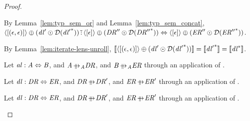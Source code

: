 \documentclass[numbers,10pt,preprint\ifanon ,nocopyrightspace\fi]{sigplanconf}
\begin{document}
\begin{proof}
\begin{case}[\AtomUnrollstarLeftRule{},\AtomUnrollstarRightRule{}]
\begin{subcase}[\ParallelAtomStructuralRewriteRule{}]
      By Lemma~\ref{lem:typ_sem_or} and Lemma~\ref{lem:typ_sem_concat},
      $\langle[(\epsilon,\epsilon)]\rangle \oplus
      (\mathit{dl}' \odot \mathcal{D}({\mathit{dl}'}^*))
      \,\tilde{:}\, \langle[\epsilon]\rangle \oplus (\mathit{DR}''
      \odot \mathcal{D}({\mathit{DR}''}^*)) \Leftrightarrow
      \langle[\epsilon]\rangle \oplus (\mathit{ER}'' \odot
      \mathcal{D}({\mathit{ER}''}^*))$.

      By Lemma~\ref{lem:iterate-lens-unroll},
      $[ \! [\langle[(\epsilon,\epsilon)]\rangle
        \oplus
        (\mathit{dl}' \odot \mathcal{D}({\mathit{dl}'}^*))] \! ] =
      [ \! [{\mathit{dl}'}^*] \! ] = [ \! [{\mathit{dl}}^*] \! ]$.
    \end{subcase}
  \end{case}
  
  \begin{case}[\ParallelAtomStructuralRewriteRule{}]
    Let $\mathit{al} : \mathit{A} \Leftrightarrow \mathit{B}$, and
    $\Atom\ParallelRewriteAtom\DNFRegex$, and $\AtomAlt\ParallelRewriteAtom\DNFRegexAlt$
    through an application of \ParallelAtomStructuralRewriteRule{}.
  \end{case}

  \begin{case}[\ParallelDNFStructuralRewriteRule{}]
    Let $\mathit{dl} : \mathit{DR} \Leftrightarrow \mathit{ER}$, and
    $\DNFRegex\ParallelRewrite\DNFRegex'$, and $\DNFRegexAlt\ParallelRewrite\DNFRegexAlt'$
    through an application of \ParallelDNFStructuralRewriteRule{}.
  \end{case}
  
  \begin{case}[\IdentityRewriteRule{}]
    Let $\mathit{dl} : \mathit{DR} \Leftrightarrow \mathit{ER}$, and
    $\DNFRegex\ParallelRewrite\DNFRegex'$, and $\DNFRegexAlt\ParallelRewrite\DNFRegexAlt'$
    through an application of \IdentityRewriteRule{}.
  \end{case}
\end{proof}
\end{document}

